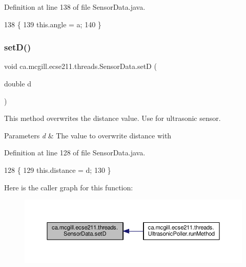 Definition at line 138 of file Sensor\+Data.\+java.


\begin{DoxyCode}
138                              \{
139       this.angle = a;
140   \}
\end{DoxyCode}
\mbox{\label{classca_1_1mcgill_1_1ecse211_1_1threads_1_1_sensor_data_a2c1f8e625478b89aabe6e9911e482ef3}} 
\subsubsection{\texorpdfstring{set\+D()}{setD()}}
{\footnotesize\ttfamily void ca.\+mcgill.\+ecse211.\+threads.\+Sensor\+Data.\+setD (\begin{DoxyParamCaption}\item[{double}]{d }\end{DoxyParamCaption})}

This method overwrites the distance value. Use for ultrasonic sensor.


\begin{DoxyParams}{Parameters}
{\em d} & The value to overwrite distance with \\
\hline
\end{DoxyParams}


Definition at line 128 of file Sensor\+Data.\+java.


\begin{DoxyCode}
128                              \{
129       this.distance = d;
130   \}
\end{DoxyCode}
Here is the caller graph for this function\+:\nopagebreak
\begin{figure}[H]
\begin{center}
\leavevmode
\includegraphics[width=350pt]{classca_1_1mcgill_1_1ecse211_1_1threads_1_1_sensor_data_a2c1f8e625478b89aabe6e9911e482ef3_icgraph}
\end{center}
\end{figure}
\mbox{\label{classca_1_1mcgill_1_1ecse211_1_1threads_1_1_sensor_data_af905a6f2825716ae1a39bf7f6be09477}} 
